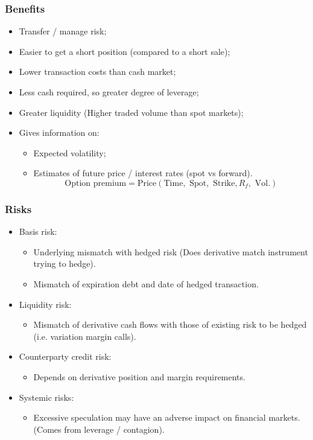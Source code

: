 \documentclass[../notes_compiled.tex]{subfiles}
\begin{document}
\subsubsection*{Benefits}
\begin{itemize}
\item Transfer / manage risk;
\item Easier to get a short position (compared to a short sale);
\item Lower transaction costs than cash market;
\item Less cash required, so greater degree of leverage;
\item Greater liquidity (Higher traded volume than spot markets);
\item Gives information on:
\begin{itemize}
\item Expected volatility;
\item Estimates of future price / interest rates (spot vs forward).
\begin{equation}
\text{Option premium} = \text{Price}(\text{Time}, \text{ Spot}, \text{ Strike}, R_{f}, \text{ Vol.})
\end{equation}
\end{itemize}
\end{itemize}


\subsubsection*{Risks}
\begin{itemize}
\item Basis risk:
\begin{itemize}
\item Underlying mismatch with hedged risk (Does derivative match instrument trying to hedge).
\item Mismatch of expiration debt and date of hedged transaction.
\end{itemize}

\item Liquidity risk:
\begin{itemize}
\item Mismatch of derivative cash flows with those of existing risk to be hedged (i.e. variation margin calls).
\end{itemize}

\item Counterparty credit risk:
\begin{itemize}
\item Depends on derivative position and margin requirements.
\end{itemize}

\item Systemic risks:
\begin{itemize}
\item Excessive speculation may have an adverse impact on financial markets. (Comes from leverage / contagion).
\end{itemize}

\end{itemize}
\end{document}
